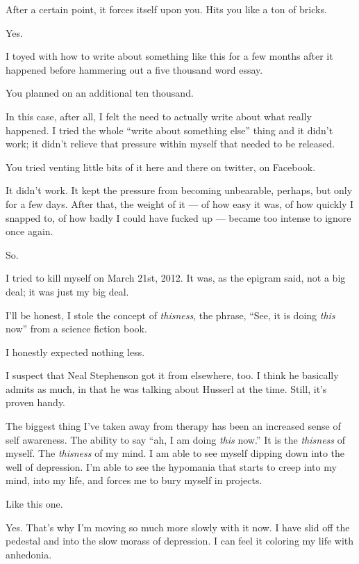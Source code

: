 \begin{ally}
After a certain point, it forces itself upon you. Hits you like a ton of bricks.
\end{ally}
Yes.

I toyed with how to write about something like this for a few months after it happened before hammering out a five thousand word essay.

\begin{ally}
You planned on an additional ten thousand.
\end{ally}
In this case, after all, I felt the need to actually write about what really happened. I tried the whole ``write about something else'' thing and it didn't work; it didn't relieve that pressure within myself that needed to be released.

\begin{ally}
You tried venting little bits of it here and there on twitter, on Facebook.
\end{ally}
It didn't work. It kept the pressure from becoming unbearable, perhaps, but only for a few days. After that, the weight of it --- of how easy it was, of how quickly I snapped to, of how badly I could have fucked up --- became too intense to ignore once again.

So.

I tried to kill myself on March 21st, 2012. It was, as the epigram said, not a big deal; it was just my big deal.
\newpage

\noindent I'll be honest, I stole the concept of \emph{thisness}, the phrase, ``See, it is doing \emph{this} now'' from a science fiction book.

\begin{ally}
I honestly expected nothing less.
\end{ally}
I suspect that Neal Stephenson got it from elsewhere, too. I think he basically admits as much, in that he was talking about Husserl at the time. Still, it's proven handy.

The biggest thing I've taken away from therapy has been an increased sense of self awareness. The ability to say ``ah, I am doing \emph{this} now.'' It is the \emph{thisness} of myself. The \emph{thisness} of my mind. I am able to see myself dipping down into the well of depression. I'm able to see the hypomania that starts to creep into my mind, into my life, and forces me to bury myself in projects.

\begin{ally}
Like this one.
\end{ally}
Yes. That's why I'm moving so much more slowly with it now. I have slid off the pedestal and into the slow morass of depression. I can feel it coloring my life with anhedonia.

